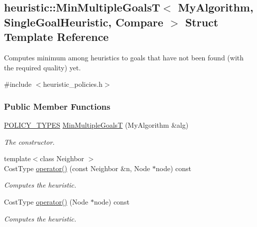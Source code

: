 \hypertarget{structheuristic_1_1MinMultipleGoalsT}{}\subsection{heuristic\+:\+:Min\+Multiple\+GoalsT$<$ My\+Algorithm, Single\+Goal\+Heuristic, Compare $>$ Struct Template Reference}
\label{structheuristic_1_1MinMultipleGoalsT}


Computes minimum among heuristics to goals that have not been found (with the required quality) yet.  




{\ttfamily \#include $<$heuristic\+\_\+policies.\+h$>$}

\subsubsection*{Public Member Functions}
\begin{DoxyCompactItemize}
\item 
\hyperlink{extensions_2shared__policies_2headers_8h_ae70a06fa4631780beea14971eb36a562}{P\+O\+L\+I\+C\+Y\+\_\+\+T\+Y\+P\+ES} \hyperlink{structheuristic_1_1MinMultipleGoalsT_aa98a54035f23ebe26e25451cc2a7ff4e}{Min\+Multiple\+GoalsT} (My\+Algorithm \&alg)
\begin{DoxyCompactList}\small\item\em The constructor. \end{DoxyCompactList}\item 
{\footnotesize template$<$class Neighbor $>$ }\\Cost\+Type \hyperlink{structheuristic_1_1MinMultipleGoalsT_a96a715cd3de0ce289384c14266dff611}{operator()} (const Neighbor \&n, Node $\ast$node) const 
\begin{DoxyCompactList}\small\item\em Computes the heuristic. \end{DoxyCompactList}\item 
Cost\+Type \hyperlink{structheuristic_1_1MinMultipleGoalsT_a03b307fbc81b7c56c3121af82ebadd94}{operator()} (Node $\ast$node) const 
\begin{DoxyCompactList}\small\item\em Computes the heuristic. \end{DoxyCompactList}\end{DoxyCompactItemize}
